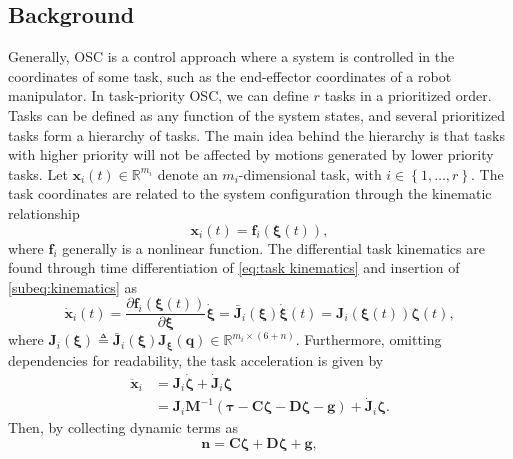 \documentclass[../main.tex]{subfiles}
\begin{document}
\subsection{Background}\label{subsec:OSC background}
Generally, OSC is a control approach where a system is controlled in the coordinates of some task, such as the end-effector coordinates of a robot manipulator. In task-priority OSC, we can define $r$ tasks in a prioritized order. Tasks can be defined as any function of the system states, and several prioritized tasks form a hierarchy of tasks. The main idea behind the hierarchy is that tasks with higher priority will not be affected by motions generated by lower priority tasks. Let $\bm{x}_i(t) \in \mathbb{R}^{m_i}$ denote an $m_i$-dimensional task, with $i \in \left\{1, \dots, r\right\}$. The task coordinates are related to the system configuration through the kinematic relationship
\begin{equation}\label{eq:task kinematics}
    \bm{x}_i(t) = \bm{f}_i{\left(\bm{\xi}(t)\right)},
\end{equation}
where $\bm{f}_i$ generally is a nonlinear function. The differential task kinematics are found through time differentiation of \eqref{eq:task kinematics} and insertion of \eqref{subeq:kinematics} as
\begin{equation}\label{eq:diff kinematics}
    \dot{\bm{x}}_i(t) = \dfrac{\partial \bm{f}_i{\left( \bm{\xi}(t)\right)}}{\partial \bm{\xi}} \dot{\bm{\xi}} = \bar{\bm{J}}_i{\left(\bm{\xi}\right)} \dot{\bm{\xi}}(t)  = \bm{J}_i{\left(\bm{\xi}(t)\right)}\bm{\zeta}(t),
\end{equation}
where $\bm{J}_i{\left(\bm{\xi}\right)} \triangleq \bar{\bm{J}}_i{\left(\bm{\xi}\right)} \bm{J}_{\bm{\xi}}{\left(\bm{q}\right)} \in \mathbb{R}^{m_i \times (6+n)}$.
Furthermore, omitting dependencies for readability, the task acceleration is given by
\begin{equation}
    \begin{aligned}
        \ddot{\bm{x}}_i &= \bm{J}_i \dot{\bm{\zeta}} + \dot{\bm{J}}_i \bm{\zeta} \\
        &= \bm{J}_i\bm{M}^{-1}(\bm{\tau}
        - \bm{C}\bm{\zeta}
        - \bm{D}\bm{\zeta}
        - \bm{g}) + \dot{\bm{J}}_i \bm{\zeta}.
    \end{aligned}
\end{equation}
Then, by collecting dynamic terms as
\begin{equation}
    \label{eq:cdg}
    \bm{n} = \bm{C}\bm{\zeta}
    + \bm{D}\bm{\zeta}
    + \bm{g},
\end{equation}
\end{document}

